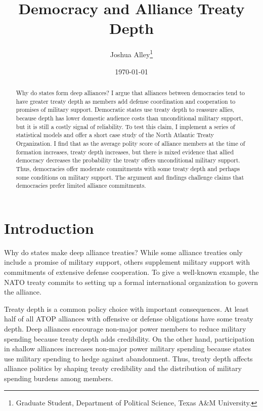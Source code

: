 \documentclass[12pt]{article}
\title{\textbf{Democracy and Alliance Treaty Depth}}
\author{Joshua Alley\footnote{Graduate Student,
Department of Political Science, Texas A\&M University.}}
\date{\today}
\begin{document}
\maketitle 

\doublespace 

\begin{abstract}
Why do states form deep alliances? 
I argue that alliances between democracies tend to have greater treaty depth as members add defense coordination and cooperation to promises of military support. 
Democratic states use treaty depth to reassure allies, because depth has lower domestic audience costs than unconditional military support, but it is still a costly signal of reliability.
To test this claim, I implement a series of statistical models and offer a short case study of the North Atlantic Treaty Organization.
I find that as the average polity score of alliance members at the time of formation increases, treaty depth increases, but there is mixed evidence that allied democracy decreases the probability the treaty offers unconditional military support. 
Thus, democracies offer moderate commitments with some treaty depth and perhaps some conditions on military support. 
The argument and findings challenge claims that democracies prefer limited alliance commitments. 
\end{abstract}


\newpage 


\section{Introduction}


Why do states make deep alliance treaties? 
While some alliance treaties only include a promise of military support, others supplement military support with commitments of extensive defense cooperation. 
To give a well-known example, the NATO treaty commits to setting up a formal international organization to govern the alliance. 


Treaty depth is a common policy choice with important consequences. 
At least half of all ATOP alliances with offensive or defense obligations have some treaty depth.
Deep alliances encourage non-major power members to reduce military spending because treaty depth adds credibility.  
On the other hand, participation in shallow alliances increases non-major power military spending because states use military spending to hedge against abandonment.
Thus, treaty depth affects alliance politics by shaping treaty credibility and the distribution of military spending burdens among members. 
\end{document}
